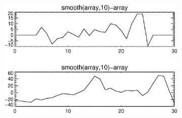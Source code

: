 \documentclass[10pt]{scrartcl}
\begin{document}
\begin{figure}[!ht]
\begin{subfigure}[b]{.3\linewidth}
        \includegraphics[width=1.0\linewidth]{../plots_tables_images/1d1dsums_1_0.eps}
    \end{subfigure}
\vspace{0.2in}


\end{figure}
\end{document}
